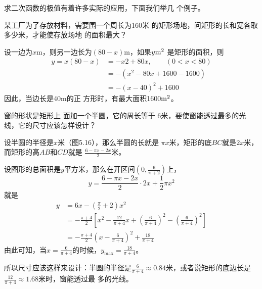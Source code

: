 求二次函数的极值有着许多实际的应用，下面我们举几
个例子。

\begin{example}
    某工厂为了存放材料，需要围一个周长为160米
的矩形场地，问矩形的长和宽各取多少米，才能使存放场地
的面积最大？
\end{example}

\begin{solution}
    设一边为$x$m，则另一边长为$(80-x)$m，如果$y{\rm m}^2$
是矩形的面积，则
\[\begin{split}
    y=x(80-x)&=-x2+80x,\qquad (0<x<80)\\
    &=-(x^2-80x+1600-1600)\\
    &=-(x-40)^2+1600
\end{split}\]
因此，当边长是40m的正
方形时，有最大面积1600${\rm m}^2$。
\end{solution}

\begin{example}
    窗的形状是矩形上
面加一个半圆，它的周长等于
6米，要使窗能透过最多的光
线，它的尺寸应该怎样设计？
\end{example}

\begin{solution}
设半圆的半径是$x$米（图5.16），那么半圆的长就是
$\pi x$米，矩形的底$BC$就是$2x$米，而矩形的高$AB$和$CD$就是
$\frac{6-\pi x-2x}{2}$米。

\begin{figure}[htp]
    \centering
{}
    \caption{}
\end{figure}

设图形的总面积是$y$平方米，那么在开区间$\left(0,\frac{6}{\pi+2}\right)$上，
\[y=\frac{6-\pi x-2x}{2}\cdot 2x+\frac{1}{2}\pi x^2\]
就是
\[\begin{split}
    y&=6x-\left(\frac{\pi}{2}+2\right)x^2\\
    &=-\frac{\pi+4}{2}\left[x^2-\frac{12}{\pi+4}x+\left(\frac{6}{\pi+4}\right)^2-\left(\frac{6}{\pi+4}\right)^2\right]\\
    &=-\frac{\pi+4}{2}\left(x-\frac{6}{\pi+4}\right)^2+\frac{18}{\pi+4}
\end{split}\]
由此可知，当$x=\frac{6}{\pi+4}$的时候，$y_{\max}=\frac{18}{\pi+4}$。

所以尺寸应该这样来设计：半圆的半径是$\frac{6}{\pi+4}\approx 0.84$米，或者说矩形的底边长是$\frac{12}{\pi+4}\approx 1.68$米时，窗能透过最
多的光线。
\end{solution}

